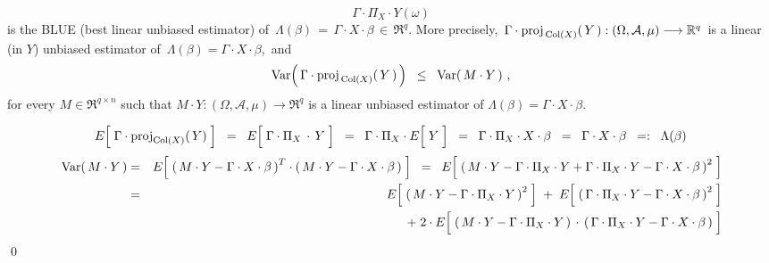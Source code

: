 \begin{theorem}
\begin{equation*}
\Gamma \cdot \Pi_{X} \cdot Y(\omega)
\end{equation*}
is the BLUE (best linear unbiased estimator) of
\,$\Lambda(\beta) \,=\, \Gamma \cdot X \cdot \beta \,\in\, \Re^{q}$.
More precisely,
\,$\Gamma \cdot \textnormal{proj}_{\,\textnormal{Col}(X)}\!\left(\,Y\,\right) : (\Omega,\mathcal{A},\mu) \longrightarrow \mathbb{R}^{q}$\,
is a linear (in $Y$) unbiased estimator of
\,$\Lambda(\beta) = \Gamma \cdot X \cdot \beta$,\, and
\begin{equation*}
\textnormal{Var}\!\left(\,\Gamma \cdot \textnormal{proj}_{\,\textnormal{Col}(X)}\!\left(\,Y\,\right)\,\right)
\;\; \leq \;\;
	\textnormal{Var}\!\left(\,M \cdot Y\,\right)\,,
\end{equation*}
for every $M \in \Re^{q \times n}$ such that
$M \cdot Y : (\Omega,\mathcal{A},\mu) \longrightarrow \Re^{q}$
is a linear unbiased estimator of
$\Lambda(\beta) = \Gamma \cdot X \cdot \beta$.
\end{theorem}
\proof
\begin{equation*}
E\!\left[\;\Gamma \cdot \proj_{\Col(X)}(\,Y)\;\right]
\;\; = \;\;
	E\!\left[\;\Gamma \cdot \Pi_{X} \overset{{\color{white}+}}{\cdot} Y\;\right]
\;\; = \;\;
	\Gamma \cdot \Pi_{X} \cdot E\!\left[\;\overset{{\color{white}.}}{Y}\;\right]
\;\; = \;\;
	\Gamma \cdot \Pi_{X} \cdot X \cdot \beta
\;\; = \;\;
	\Gamma \cdot X \cdot \beta
\;\; =: \;\;
	\Lambda(\beta)
\end{equation*}
\begin{eqnarray*}
\Var\!\left(\,M \cdot Y\,\right)
&=&
	E\!\left[\;
		\left(\,M \cdot Y - \Gamma \cdot X \cdot \beta\,\right)^{T}
		\cdot
		\left(\,M \cdot Y - \Gamma \cdot X \cdot \beta\,\right)
		\;\right]
\;\;=\;\;
	E\!\left[\;\left(\,
		M \cdot Y
		- \Gamma \cdot \Pi_{X} \cdot Y
		+ \Gamma \cdot \Pi_{X} \cdot Y
		- \Gamma \cdot X \cdot \beta
		\,\right)^{2}\;\right]
\\
&=&
	E\!\left[\;\left(\,
		M \cdot Y - \Gamma \cdot \Pi_{X} \cdot Y
		\,\right)^{2}\;\right]
	\;+\;
	E\!\left[\;\left(\,
		\Gamma \cdot \Pi_{X} \cdot Y - \Gamma \cdot X \cdot \beta
		\,\right)^{2}\;\right]
\\
&&
	\;+\;
	2 \cdot
	E\!\left[\;
		\left(\,M \cdot Y - \Gamma \cdot \Pi_{X} \cdot Y\,\right)
		\overset{{\color{white}+}}{\cdot}
		\left(\,\Gamma \cdot \Pi_{X} \cdot Y - \Gamma \cdot X \cdot \beta\,\right)
		\;\right]
\end{eqnarray*}
\qed



